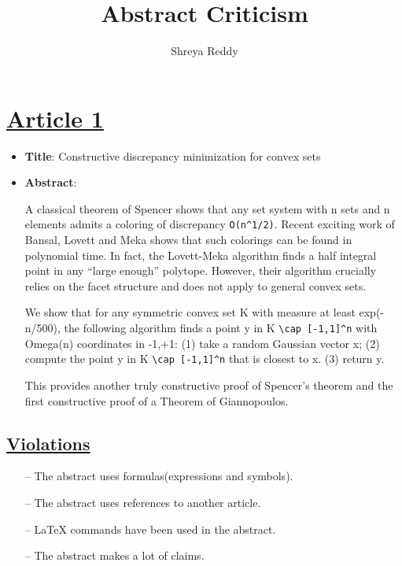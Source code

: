\documentclass[11pt,twocolumn]{article}
\title{Abstract Criticism}
\author{Shreya Reddy}
\begin{document}
\maketitle


\section{\underline{Article 1}}
\begin{itemize}
	\item {\bf{Title}}: Constructive discrepancy minimization for convex sets
	\item {\bf{Abstract}}: 

A classical theorem of Spencer shows that any set system with n sets and n elements
admits a coloring of discrepancy \verb|O(n^1/2)|.
Recent exciting work of Bansal, Lovett and Meka shows that such colorings can be found in
polynomial time. In fact, the Lovett-Meka algorithm finds a half integral point in
any ``large enough'' polytope. However, their algorithm crucially relies on
the facet structure and does not apply to general convex sets.

We show that for any symmetric convex set K with measure at least exp(-n/500),
the following algorithm finds a point y in K \verb|\cap [-1,1]^n| with Omega(n) coordinates in {-1,+1}:
(1) take a random Gaussian vector x; (2) compute the point y in K \verb|\cap [-1,1]^n| that is closest to x. (3) return y.

This provides another truly constructive proof of Spencer's theorem and the first constructive
proof of a Theorem of Giannopoulos.
\end{itemize}

\subsection {\underline{Violations}}
\begin{itemize}
	\item[--] The abstract uses formulas(expressions and symbols).
	\item[--] The abstract uses references to another article.
	\item[--] {\LaTeX} commands have been used in the abstract.
	\item[--] The abstract makes a lot of claims.
\end{itemize}
\end{document}
